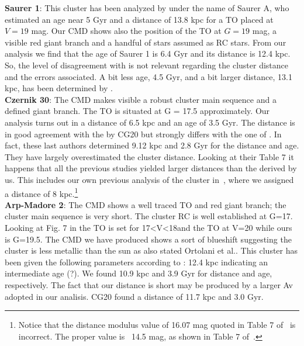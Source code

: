 \documentclass[draft]{aa}
\begin{document}
  \textbf{Saurer 1}: This cluster has been analyzed by \cite{Carraro_2003} under
  the name of Saurer A, who estimated an age near 5 Gyr and a distance of 13.8
  kpc for a TO placed at $V=19$ mag.
  Our CMD shows also the position of the TO at $G=19$ mag, a visible red giant
  branch and a handful of stars assumed as RC
  stars. From our analysis we find that the age of Saurer 1 is 6.4 Gyr
  and its distance is 12.4 kpc. So, the level of disagreement with
  \cite{Carraro_2003} is not relevant regarding the cluster distance and the
  errors associated. A bit less age, 4.5 Gyr, and a bit larger distance, 13.1 kpc,
  has been determined by \cite{Frinchaboy_2006}.\\

  \textbf{Czernik 30}: The CMD makes visible a robust cluster main sequence
  and a defined giant branch. The TO is situated at G = 17.5 approximately. Our
  analysis turns out in a distance of 6.5 kpc and an age of 3.5 Gyr. The distance
  is in good agreement with the by CG20 but strongly differs with the one
  of \cite{Hayes_2015}. In fact, these last authors determined 9.12 kpc and 2.8
  Gyr for the distance and age. They have largely overestimated the
  cluster distance. Looking at their Table 7 it happens that all
  the previous studies yielded larger distances than the derived by us. This includes
  our own previous analysis of the cluster
  in~\cite{Perren_2015}, where we assigned a distance of 8 kpc.\footnote{Notice
  that the distance modulus value of 16.07 mag quoted in Table 7
  of~\cite{Hayes_2015} is incorrect. The proper value is ~14.5 mag, as shown in
  Table 7 of~\cite{Perren_2015}.} \\

  \textbf{Arp-Madore 2}: The CMD shows a well traced TO and red giant branch; the cluster
  main sequence is very short. The cluster RC is well established at G=17.
  Looking at Fig. 7 in \cite{Ortolani_1995} the TO is
  set for 17<V<18and the TO at V=20 while ours is G=19.5. The CMD we have
  produced shows a sort of blueshift suggesting the cluster is less metallic
  than the sun as also stated Ortolani et al.. This cluster has been given the
  following parameters according to \cite{Ortolani_1995}: 12.4 kpc indicating an
  intermediate age (?).  We found 10.9 kpc and 3.9 Gyr  for distance and age, 
  respectively. The fact that
  our distance is short may be produced by a larger Av adopted in our
  analisis. CG20 found a distance of 11.7 kpc and 3.0 Gyr.\\
\end{document}

